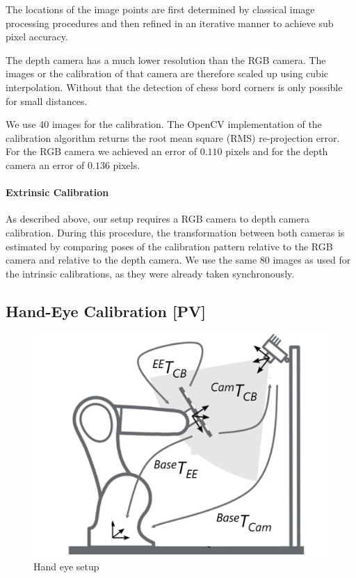 The locations of the image points are first determined by classical image processing 
procedures and then refined in an iterative manner to achieve sub pixel accuracy.

The depth camera has a much lower resolution than the RGB camera. The images or the calibration of that camera are therefore scaled up using cubic interpolation. Without that the detection of chess bord corners is only possible for small distances.

We use 40 images for the calibration. The OpenCV implementation of the calibration algorithm returns the root mean square (RMS) re-projection error. For the RGB camera we achieved an error of $0.110$ pixels and for the depth camera an error of $0.136$ pixels. 



\paragraph{Extrinsic Calibration}
As described above, our setup requires a RGB camera to depth camera calibration. During this procedure, the transformation between both cameras is estimated by comparing poses of the calibration pattern relative to the RGB camera and relative to the depth camera. We use the same 80 images as used for the intrinsic calibrations, as they were already taken synchronously. 
 


\subsection{Hand-Eye Calibration [PV]}
 \begin{figure}[ht]
	\centering
 	\includegraphics[width=\linewidth]{Handeye}
 	\caption{Hand eye setup}
 	\label{Handeyecalibrationsetup}
 \end{figure}


